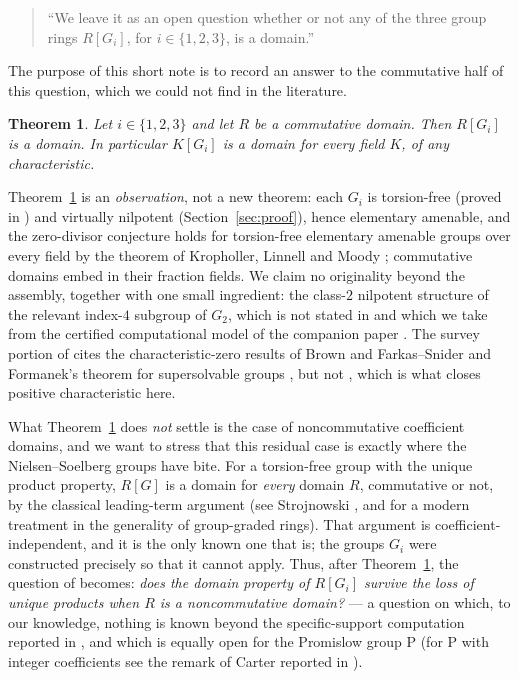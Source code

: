 \documentclass[11pt]{amsart}
\newtheorem{theorem}{Theorem}[section]
\theoremstyle{definition}
\newcommand{\GTwo}{G_2}
\renewcommand{\P}{\mathrm{P}}
\begin{document}
\begin{quote}
``We leave it as an open question whether or not any of the three group
rings $R[G_i]$, for $i\in\{1,2,3\}$, is a domain.''
\end{quote}

The purpose of this short note is to record an answer to the commutative
half of this question, which we could not find in the literature.

\begin{theorem}\label{thm:main}
Let $i\in\{1,2,3\}$ and let $R$ be a commutative domain. Then $R[G_i]$ is a
domain. In particular $K[G_i]$ is a domain for every field $K$, of any
characteristic.
\end{theorem}

Theorem~\ref{thm:main} is an \emph{observation}, not a new theorem: each
$G_i$ is torsion-free (proved in \cite{NS}) and virtually nilpotent
(Section~\ref{sec:proof}), hence elementary amenable, and the zero-divisor
conjecture holds for torsion-free elementary amenable groups over every
field by the theorem of Kropholler, Linnell and Moody \cite[Theorem
1.4]{KLM}; commutative domains embed in their fraction fields. We claim no
originality beyond the assembly, together with one small ingredient: the
class-$2$ nilpotent structure of the relevant index-$4$ subgroup of
$\GTwo$, which is not stated in \cite{NS} and which we take from the
certified computational model of the companion paper \cite{companion}. The
survey portion of \cite{NS} cites the characteristic-zero results of Brown
\cite{Brown} and Farkas--Snider \cite{FS} and Formanek's theorem for
supersolvable groups \cite{Formanek}, but not \cite{KLM}, which is what
closes positive characteristic here.

What Theorem~\ref{thm:main} does \emph{not} settle is the case of
noncommutative coefficient domains, and we want to stress that this
residual case is exactly where the Nielsen--Soelberg groups have bite. For
a torsion-free group with the unique product property, $R[G]$ is a domain
for \emph{every} domain $R$, commutative or not, by the classical
leading-term argument (see Strojnowski \cite{Strojnowski}, and
\cite{Oinert} for a modern treatment in the generality of group-graded
rings). That argument is coefficient-independent, and it is the only known
one that is; the groups $G_i$ were constructed precisely so that it cannot
apply. Thus, after Theorem~\ref{thm:main}, the question of \cite{NS}
becomes: \emph{does the domain property of $R[G_i]$ survive the loss of
unique products when $R$ is a noncommutative domain?} --- a question on
which, to our knowledge, nothing is known beyond the specific-support
computation reported in \cite{NS,Soelberg}, and which is equally open for
the Promislow group $\P$ (for $\P$ with integer coefficients see the remark
of Carter \cite{Carter} reported in \cite{NS}).
\end{document}
